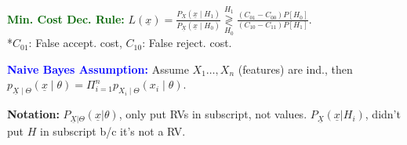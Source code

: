 \documentclass[5pt]{extarticle} %
\begin{document}
\begin{paracol}{3}
{    \textcolor{darkgreen}{\textbf{Min. Cost Dec. Rule:}} 
    $L(\underline{x}) = \frac{P_{\underline{X}} (\underline{x} \mid H_1)}{P_{\underline{X}} (\underline{x} \mid H_0)}\overset{H_1}{\underset{H_0}{\gtrless}} \frac{(C_{01} - C_{00}) P[H_0]}{(C_{10} - C_{11})P[H_1]}$. \\
    *$C_{01}$: False accept. cost, $C_{10}$: False reject. cost.

    \textcolor{blue}{\textbf{Naive Bayes Assumption:}} Assume $X_1 \ldots, X_n$ (features) are ind., then $p_{\underline{X} \mid \Theta} (\underline{x} \mid \theta) = \Pi_{i=1}^n p_{X_i \mid \Theta} (x_i \mid \theta)$.

    \textbf{Notation:} $P_{\underline{X} | \Theta} (\underline{x} | \theta)$, only put RVs in subscript, not values. $P_{\underline{X}} (\underline{x} | H_i)$, didn't put $H$ in subscript b/c it's not a RV.





}
\end{paracol}
\end{document}
